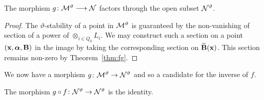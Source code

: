 \documentclass{amsart}
\newcommand{\balpha}{\boldsymbol{\alpha}}
\theoremstyle{definition}
\begin{document}
\begin{corollary}
The morphism $g \colon \mathcal{M}^\vartheta \longrightarrow \mathcal{N}$ factors through the open subset $\mathcal{N}^\vartheta$.
\end{corollary}

\begin{proof}
The $\vartheta$-stability of a point in $\mathcal{M}^\vartheta$ is guaranteed by the non-vanishing of section of a power of $\otimes_{i \in Q_0} L_i$.
We may construct such a section on a point $(\bfx, \balpha, \bfB)$ in the image by taking the corresponding section on $\widetilde{\mathbf{B}}(\mathbf{x})$.
This section remains non-zero by Theorem~\ref{thm:fg}.
\end{proof}

We now have a morphism $g \colon \mathcal{M}^\vartheta \rightarrow \mathcal{N}^\vartheta$ and so a candidate for the inverse of $f$.

\begin{theorem}\label{thm:ghilb}
The morphism $g \circ f \colon \mathcal{N}^\vartheta \rightarrow \mathcal{N}^\vartheta$ is the identity.
\end{theorem}
\end{document}
